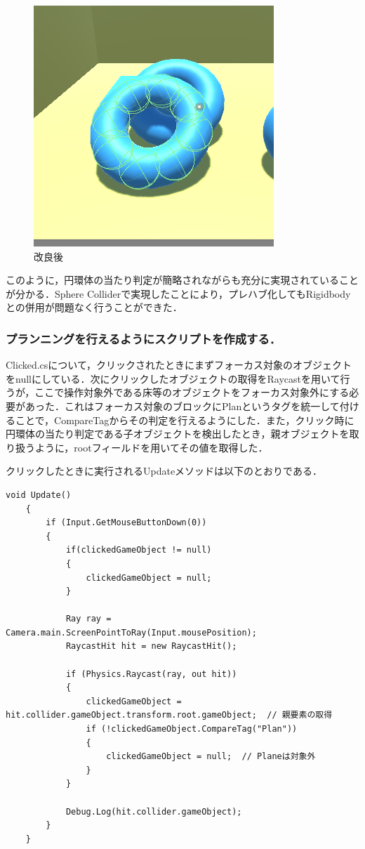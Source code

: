 \documentclass[uplatex,12pt]{jsarticle}
\begin{document}
\begin{figure}[!hbt]
  	\begin{center}
  		\includegraphics[scale=0.5]{images/bwp2.png}
	\end{center}
  	\caption{改良後}
  	\label{fig:bwp2}
\end{figure}

このように，円環体の当たり判定が簡略されながらも充分に実現されていることが分かる．Sphere Colliderで実現したことにより，プレハブ化してもRigidbodyとの併用が問題なく行うことができた．

\subsubsection{プランニングを行えるようにスクリプトを作成する．}
Clicked.csについて，クリックされたときにまずフォーカス対象のオブジェクトをnullにしている．次にクリックしたオブジェクトの取得をRaycastを用いて行うが，ここで操作対象外である床等のオブジェクトをフォーカス対象外にする必要があった．これはフォーカス対象のブロックにPlanというタグを統一して付けることで，CompareTagからその判定を行えるようにした．また，クリック時に円環体の当たり判定である子オブジェクトを検出したとき，親オブジェクトを取り扱うように，rootフィールドを用いてその値を取得した．

クリックしたときに実行されるUpdateメソッドは以下のとおりである．

\begin{lstlisting}[caption=ClickedクラスのUpdateメソッド, label=clicked]
    void Update()
    {
        if (Input.GetMouseButtonDown(0))
        {
            if(clickedGameObject != null)
            {
                clickedGameObject = null;
            }

            Ray ray = Camera.main.ScreenPointToRay(Input.mousePosition);
            RaycastHit hit = new RaycastHit();

            if (Physics.Raycast(ray, out hit))
            {
                clickedGameObject = hit.collider.gameObject.transform.root.gameObject;  // 親要素の取得
                if (!clickedGameObject.CompareTag("Plan"))
                {
                    clickedGameObject = null;  // Planeは対象外
                }
            }

            Debug.Log(hit.collider.gameObject);
        }
    }
\end{lstlisting}
\end{document}
